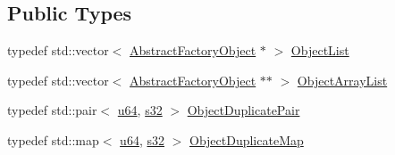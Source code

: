 \subsection*{Public Types}
\begin{DoxyCompactItemize}
\item 
typedef std\+::vector$<$ \mbox{\hyperlink{classnjli_1_1_abstract_factory_object}{Abstract\+Factory\+Object}} $\ast$ $>$ \mbox{\hyperlink{classnjli_1_1_world_factory_a987ddbccec6101d2a0ca72f9ecfc0249}{Object\+List}}
\item 
typedef std\+::vector$<$ \mbox{\hyperlink{classnjli_1_1_abstract_factory_object}{Abstract\+Factory\+Object}} $\ast$$\ast$ $>$ \mbox{\hyperlink{classnjli_1_1_world_factory_a0b1357052d11887d1561fbd882acd177}{Object\+Array\+List}}
\item 
typedef std\+::pair$<$ \mbox{\hyperlink{_util_8h_ad758b7a5c3f18ed79d2fcd23d9f16357}{u64}}, \mbox{\hyperlink{_util_8h_aa62c75d314a0d1f37f79c4b73b2292e2}{s32}} $>$ \mbox{\hyperlink{classnjli_1_1_world_factory_af17ac95ff692d4a098f82e45d135281f}{Object\+Duplicate\+Pair}}
\item 
typedef std\+::map$<$ \mbox{\hyperlink{_util_8h_ad758b7a5c3f18ed79d2fcd23d9f16357}{u64}}, \mbox{\hyperlink{_util_8h_aa62c75d314a0d1f37f79c4b73b2292e2}{s32}} $>$ \mbox{\hyperlink{classnjli_1_1_world_factory_a15eec8c4710c8ec66e7cd06dd2327be6}{Object\+Duplicate\+Map}}
\end{DoxyCompactItemize}
